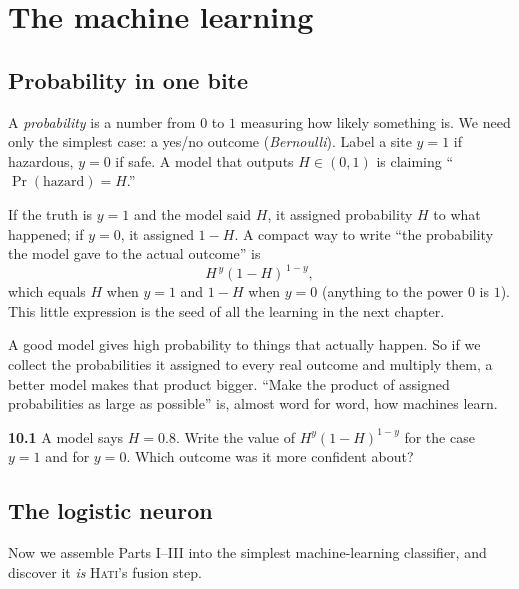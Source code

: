 \documentclass[11pt,oneside]{book}
\begin{document}
\part{The machine learning}

\chapter{Probability in one bite}

A \emph{probability} is a number from $0$ to $1$ measuring how likely something is. We
need only the simplest case: a yes/no outcome (\emph{Bernoulli}). Label a site $y=1$ if
hazardous, $y=0$ if safe. A model that outputs $H\in(0,1)$ is claiming
``$\Pr(\text{hazard})=H$.''

If the truth is $y=1$ and the model said $H$, it assigned probability $H$ to what
happened; if $y=0$, it assigned $1-H$. A compact way to write ``the probability the
model gave to the actual outcome'' is
\begin{equation}
H^{\,y}(1-H)^{\,1-y},
\end{equation}
which equals $H$ when $y=1$ and $1-H$ when $y=0$ (anything to the power $0$ is $1$).
This little expression is the seed of all the learning in the next chapter.

\begin{intuition}
A good model gives high probability to things that actually happen. So if we collect
the probabilities it assigned to every real outcome and multiply them, a better model
makes that product bigger. ``Make the product of assigned probabilities as large as
possible'' is, almost word for word, how machines learn.
\end{intuition}

\begin{practice}
\textbf{10.1} A model says $H=0.8$. Write the value of $H^y(1-H)^{1-y}$ for the case
$y=1$ and for $y=0$. Which outcome was it more confident about?
\end{practice}

\chapter{The logistic neuron}

Now we assemble Parts I--III into the simplest machine-learning classifier, and
discover it \emph{is} \textsc{Hati}'s fusion step.
\end{document}

